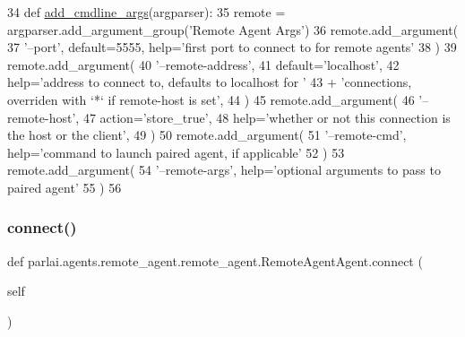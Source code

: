 \begin{DoxyCode}
34     \textcolor{keyword}{def }\hyperlink{namespaceparlai_1_1agents_1_1drqa_1_1config_a62fdd5554f1da6be0cba185271058320}{add\_cmdline\_args}(argparser):
35         remote = argparser.add\_argument\_group(\textcolor{stringliteral}{'Remote Agent Args'})
36         remote.add\_argument(
37             \textcolor{stringliteral}{'--port'}, default=5555, help=\textcolor{stringliteral}{'first port to connect to for remote agents'}
38         )
39         remote.add\_argument(
40             \textcolor{stringliteral}{'--remote-address'},
41             default=\textcolor{stringliteral}{'localhost'},
42             help=\textcolor{stringliteral}{'address to connect to, defaults to localhost for '}
43             + \textcolor{stringliteral}{'connections, overriden with `*` if remote-host is set'},
44         )
45         remote.add\_argument(
46             \textcolor{stringliteral}{'--remote-host'},
47             action=\textcolor{stringliteral}{'store\_true'},
48             help=\textcolor{stringliteral}{'whether or not this connection is the host or the client'},
49         )
50         remote.add\_argument(
51             \textcolor{stringliteral}{'--remote-cmd'}, help=\textcolor{stringliteral}{'command to launch paired agent, if applicable'}
52         )
53         remote.add\_argument(
54             \textcolor{stringliteral}{'--remote-args'}, help=\textcolor{stringliteral}{'optional arguments to pass to paired agent'}
55         )
56 
\end{DoxyCode}
\mbox{\label{classparlai_1_1agents_1_1remote__agent_1_1remote__agent_1_1RemoteAgentAgent_a4c9288700c31a67d1a4414b161f2851e}} 
\subsubsection{\texorpdfstring{connect()}{connect()}}
{\footnotesize\ttfamily def parlai.\+agents.\+remote\+\_\+agent.\+remote\+\_\+agent.\+Remote\+Agent\+Agent.\+connect (\begin{DoxyParamCaption}\item[{}]{self }\end{DoxyParamCaption})}

